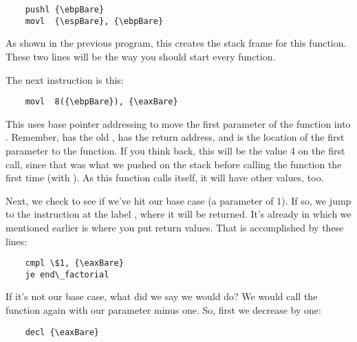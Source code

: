 \begin{simpletyping}
\begin{lstlisting}
	pushl {\ebpBare}
	movl  {\espBare}, {\ebpBare}
\end{lstlisting}
\end{simpletyping}

As shown in the previous program, this creates the stack frame
for this function.  These two lines will be the way you should
start every function.

The next instruction is this:

\begin{simpletyping}
\begin{lstlisting}
	movl  8({\ebpBare}), {\eaxBare}
\end{lstlisting}
\end{simpletyping}

This uses base pointer addressing to move the first parameter
of the function into {\eaxReg}.  Remember, \icode{({\ebpBare})}
has the old {\ebpReg},  has the return address,
and  is the location of the first parameter 
to the function.  If you think back, this will be the value 4
on the first call, since
that was what we pushed on the stack before calling the function the
first time (with ).  As this function calls itself,
it will have other values, too.

Next, we check to see if we've hit our base case (a parameter of 1).  If
so, we jump to the instruction at the label ,
where it will be returned.  It's already in {\eaxReg} which
we mentioned earlier is where you put return values.  That is accomplished
by these lines:

\begin{simpletyping}
\begin{lstlisting}
	cmpl \$1, {\eaxBare}
	je end\_factorial
\end{lstlisting}
\end{simpletyping}

If it's not our base case, what did we say we would do?  We would call
the  function again with our parameter minus
one.  So, first we decrease {\eaxReg} by one:

\begin{simpletyping}
\begin{lstlisting}
	decl {\eaxBare}
\end{lstlisting}
\end{simpletyping}

